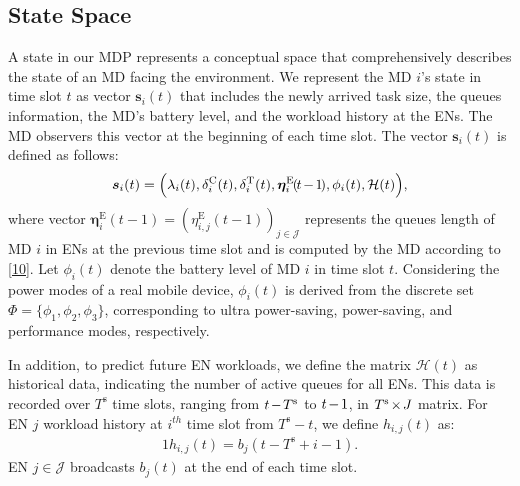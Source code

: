 \documentclass[12pt,draftclsnofoot,onecolumn]{IEEEtran}
\begin{document}
\subsection{State Space}
A state in our MDP represents a conceptual space that comprehensively describes the state of an MD facing the environment. We represent the MD $i$'s state in time slot $t$ as vector $\boldsymbol{s}_i(t)$ that includes the newly arrived task size, the queues information, the MD's battery level, and the workload history at the ENs. The MD observers this vector at the beginning of each time slot. The vector $\boldsymbol{s}_i(t)$ is defined as follows:
\begin{alignat}{1}
	\boldsymbol{s}_i(t) = \Big(\lambda_i(t), \delta_i^{\text{C}}(t), \delta_i^{\text{T}}(t), \boldsymbol{\eta}_i^{\text{E}}\hspace{-0.4mm}(\hspace{-0.4mm}t\hspace{-0.4mm}-\hspace{-0.4mm}1\hspace{-0.5mm}),\phi_i(t), \mathcal{H}(t) \Big),
	\label{18}
\end{alignat}
where vector $\boldsymbol{\eta}_i^{\text{E}}(t-1) = (\eta_{i,j}^{\text{E}}(t-1))_{j \in \mathcal{J}}$ represents the queues length of MD $i$ in ENs at the previous time slot and is computed by the MD according to \eqref{10}. Let $\phi_i(t)$ denote the battery level of MD $i$ in time slot $t$. Considering the power modes of a real mobile device, $\phi_i(t)$ is derived from the discrete set $\Phi=\{\phi_1,\phi_2,\phi_3\}$, corresponding to ultra power-saving, power-saving, and performance modes, respectively.

In addition, to predict future EN workloads, we define the matrix $\mathcal{H}(t)$ as historical data, indicating the number of active queues for all ENs. This data is recorded over $T^{\text{s}}$ time slots, ranging from $t\hspace{-0.4mm}-\hspace{-0.4mm}T^{\text{s}}$ to $t\hspace{-0.4mm}-\hspace{-0.4mm}1$, in $T^{\text{s}}\hspace{-0.4mm}\times \hspace{-0.4mm} J$ matrix. For EN $j$ workload history at $i^{th}$ time slot from $T^{\text{s}}-t$, we define $h_{i,j}(t)$ as:
\begin{alignat}{1}
	h_{i,j}(t) = b_j(t - T^{\text{s}} + i - 1).
	\label{19}
\end{alignat}
EN $j \in \mathcal{J}$ broadcasts $b_j(t)$ at the end of each time slot. %
\end{document}
